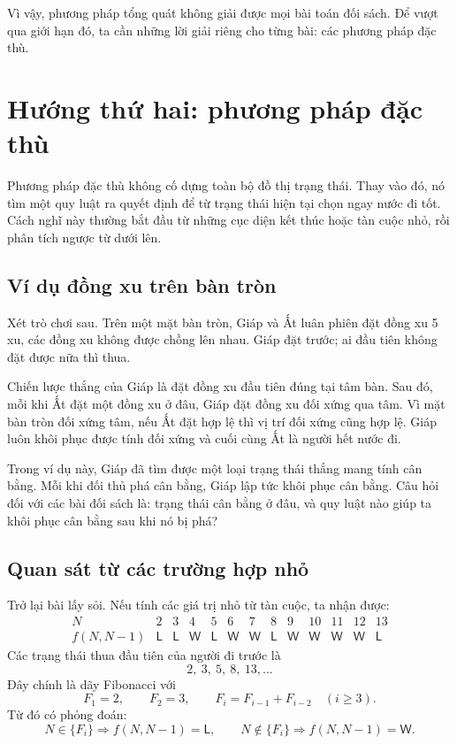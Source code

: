 \documentclass[11pt]{article}
\newcommand{\Win}{\mathsf{W}}
\newcommand{\Lose}{\mathsf{L}}
\begin{document}
Vì vậy, phương pháp tổng quát không giải được mọi bài toán đối sách. Để vượt
qua giới hạn đó, ta cần những lời giải riêng cho từng bài: các phương pháp
đặc thù.

\section{Hướng thứ hai: phương pháp đặc thù}

Phương pháp đặc thù không cố dựng toàn bộ đồ thị trạng thái. Thay vào đó, nó
tìm một quy luật ra quyết định để từ trạng thái hiện tại chọn ngay nước đi
tốt. Cách nghĩ này thường bắt đầu từ những cục diện kết thúc hoặc tàn cuộc
nhỏ, rồi phân tích ngược từ dưới lên.

\subsection{Ví dụ đồng xu trên bàn tròn}

Xét trò chơi sau. Trên một mặt bàn tròn, Giáp và Ất luân phiên đặt đồng xu
5 xu, các đồng xu không được chồng lên nhau. Giáp đặt trước; ai đầu tiên
không đặt được nữa thì thua.

Chiến lược thắng của Giáp là đặt đồng xu đầu tiên đúng tại tâm bàn. Sau đó,
mỗi khi Ất đặt một đồng xu ở đâu, Giáp đặt đồng xu đối xứng qua tâm. Vì mặt
bàn tròn đối xứng tâm, nếu Ất đặt hợp lệ thì vị trí đối xứng cũng hợp lệ.
Giáp luôn khôi phục được tính đối xứng và cuối cùng Ất là người hết nước đi.

Trong ví dụ này, Giáp đã tìm được một loại trạng thái thắng mang tính cân
bằng. Mỗi khi đối thủ phá cân bằng, Giáp lập tức khôi phục cân bằng. Câu hỏi
đối với các bài đối sách là: trạng thái cân bằng ở đâu, và quy luật nào giúp
ta khôi phục cân bằng sau khi nó bị phá?

\subsection{Quan sát từ các trường hợp nhỏ}

Trở lại bài lấy sỏi. Nếu tính các giá trị nhỏ từ tàn cuộc, ta nhận được:
\[
\begin{array}{c|cccccccccccc}
N & 2&3&4&5&6&7&8&9&10&11&12&13\\ \hline
f(N,N-1) & \Lose&\Lose&\Win&\Lose&\Win&\Win&
\Lose&\Win&\Win&\Win&\Win&\Lose
\end{array}
\]
Các trạng thái thua đầu tiên của người đi trước là
\[
  2,\ 3,\ 5,\ 8,\ 13,\ldots
\]
Đây chính là dãy Fibonacci với
\[
  F_1=2,\qquad F_2=3,\qquad F_i=F_{i-1}+F_{i-2}\quad(i\ge 3).
\]
Từ đó có phỏng đoán:
\[
  N\in\{F_i\}\Longrightarrow f(N,N-1)=\Lose,
  \qquad
  N\notin\{F_i\}\Longrightarrow f(N,N-1)=\Win.
\]
\end{document}
